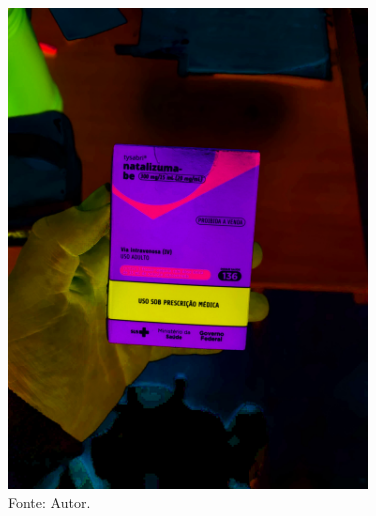 \begin{frame}
\begin{columns}
\begin{column}{0.5\textwidth}
\begin{figure}
				\includegraphics[width=0.85\textwidth]{../pictures/tysabri_cmyk_boxes.jpg}
				\caption*{Fonte: Autor.}
			\end{figure}
		\end{column}
	\end{columns}
\end{frame}

